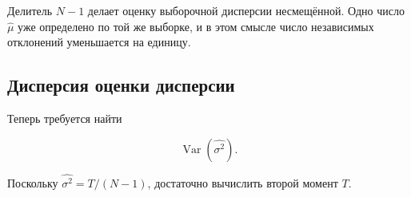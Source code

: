 \documentclass[
  russian,
  12pt,
  a4paper,
  a4paper,
  openany]{scrbook}
\begin{document}
Делитель \(N-1\) делает оценку выборочной дисперсии несмещённой. Одно
число \(\widehat\mu\) уже определено по той же выборке, и в этом смысле
число независимых отклонений уменьшается на единицу.

\subsection{Дисперсия оценки
дисперсии}\label{ux434ux438ux441ux43fux435ux440ux441ux438ux44f-ux43eux446ux435ux43dux43aux438-ux434ux438ux441ux43fux435ux440ux441ux438ux438}

Теперь требуется найти

\[
\operatorname{Var}(\widehat{\sigma^2}).
\]

Поскольку \(\widehat{\sigma^2}=T/(N-1)\), достаточно вычислить второй
момент \(T\).
\end{document}
